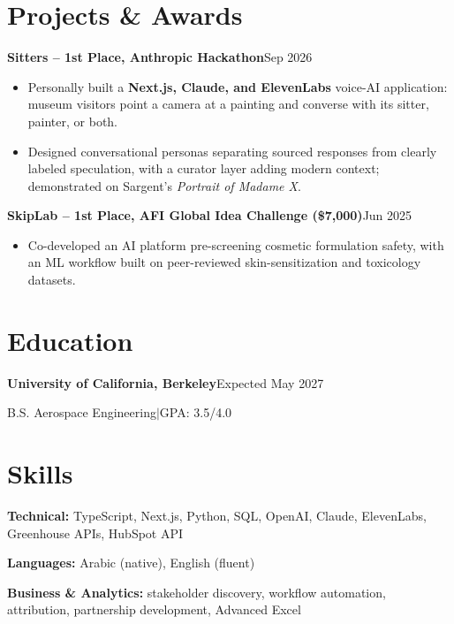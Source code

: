 \documentclass[a4paper,10pt]{article}
\newcommand{\project}[2]{\textbf{#1}\hfill #2\par}
\begin{document}
\section{Projects \& Awards}
\project{Sitters -- 1st Place, Anthropic Hackathon}{Sep 2026}
\begin{itemize}
  \item Personally built a \textbf{Next.js, Claude, and ElevenLabs} voice-AI application: museum visitors point a camera at a painting and converse with its sitter, painter, or both.
  \item Designed conversational personas separating sourced responses from clearly labeled speculation, with a curator layer adding modern context; demonstrated on Sargent's \textit{Portrait of Madame X}.
\end{itemize}
\project{SkipLab -- 1st Place, AFI Global Idea Challenge (\$7,000)}{Jun 2025}
\begin{itemize}
  \item Co-developed an AI platform pre-screening cosmetic formulation safety, with an ML workflow built on peer-reviewed skin-sensitization and toxicology datasets.
\end{itemize}

\section{Education}
\textbf{University of California, Berkeley}\hfill Expected May 2027\par
B.S. Aerospace Engineering\enspace$|$\enspace GPA: 3.5/4.0\par

\section{Skills}
\textbf{Technical:} TypeScript, Next.js, Python, SQL, OpenAI, Claude, ElevenLabs, Greenhouse APIs, HubSpot API\par
\textbf{Languages:} Arabic (native), English (fluent)\par
\textbf{Business \& Analytics:} stakeholder discovery, workflow automation, attribution, partnership development, Advanced Excel
\end{document}
